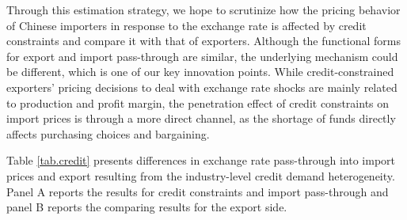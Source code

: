\documentclass[12pt]{article}
\begin{document}
Through this estimation strategy, we hope to scrutinize how the pricing behavior of Chinese importers in response to the exchange rate is affected by credit constraints and compare it with that of exporters. Although the functional forms for export and import pass-through are similar, the underlying mechanism could be different, which is one of our key innovation points. While credit-constrained exporters’ pricing decisions to deal with exchange rate shocks are mainly related to production and profit margin, the penetration effect of credit constraints on import prices is through a more direct channel, as the shortage of funds directly affects purchasing choices and bargaining.

Table \ref{tab.credit} presents differences in exchange rate pass-through into import prices and export resulting from the industry-level credit demand heterogeneity. Panel A reports the results for credit constraints and import pass-through and panel B reports the comparing results for the export side. 
\end{document}
